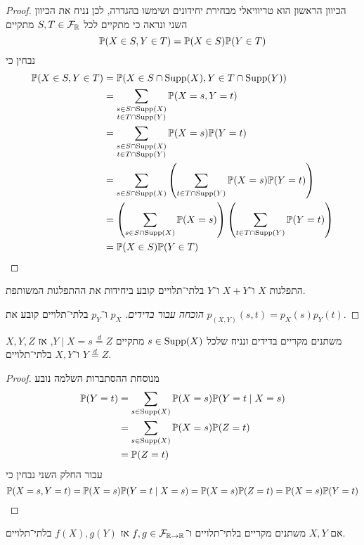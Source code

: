 \begin{proof}
	הכיוון הראשון הוא טריוויאלי מבחירת יחידונים ושימשו בהגדרה, לכן נניח את הכיוון השני ונראה כי מתקיים לכל $S, T \in \mathcal{F}_{\mathbb{R}}$ מתקיים
	\[
		\mathbb{P}(X \in S, Y \in T) = \mathbb{P}(X \in S) \mathbb{P}(Y \in T)
	\]
	נבחין כי
	\begin{align*}
		\mathbb{P}(X \in S, Y \in T)
		& = \mathbb{P}(X \in S \cap \operatorname{Supp}(X), Y \in T \cap \operatorname{Supp}(Y)) \\
		& = \sum_{\substack{s \in S \cap \operatorname{Supp}(X) \\ t \in T \cap \operatorname{Supp}(Y)}} \mathbb{P}(X = s, Y = t) \\
		& = \sum_{\substack{s \in S \cap \operatorname{Supp}(X) \\ t \in T \cap \operatorname{Supp}(Y)}} \mathbb{P}(X = s) \mathbb{P}(Y = t) \\
		& = \sum_{s \in S \cap \operatorname{Supp}(X)} \left( \sum_{t \in T \cap \operatorname{Supp}(Y)} \mathbb{P}(X = s) \mathbb{P}(Y = t) \right) \\
		& = \left( \sum_{s \in S \cap \operatorname{Supp}(X)} \mathbb{P}(X = s) \right) \left( \sum_{t \in T \cap \operatorname{Supp}(Y)} \mathbb{P}(Y = t) \right) \\
		& = \mathbb{P}(X \in S) \mathbb{P}(Y \in T)
	\end{align*}
\end{proof}
\begin{proposition}
	התפלגות $X$ ו־$X + Y$ ו־$Y$ בלתי־תלויים קובע ביחידות את ההתפלגות המשותפת.
\end{proposition}
\begin{proof}[הוכחה עבור בדידים]
	$p_X$ ו־$p_Y$ בלתי־תלויים קובע את $p_{(X, Y)}(s, t) = p_X(s) p_Y(t)$.
\end{proof}
\begin{proposition}
	$X, Y, Z$ משתנים מקריים בדידים ונניח שלכל $s \in \operatorname{Supp}(X)$ מתקיים $Y \mid X = s \overset{d}{=} Z$,
	אז $Y \overset{d}{=} Z$ ו־$X, Y$ בלתי־תלויים.
\end{proposition}
\begin{proof}
	מנוסחת ההסתברות השלמה נובע
	\begin{align*}
		\mathbb{P}(Y = t)
		& = \sum_{s \in \operatorname{Supp}(X)} \mathbb{P}(X = s) \mathbb{P}(Y = t \mid X = s) \\
		& = \sum_{s \in \operatorname{Supp}(X)} \mathbb{P}(X = s) \mathbb{P}(Z = t) \\
		& = \mathbb{P}(Z = t)
	\end{align*}
	עבור החלק השני נבחין כי
	\[
		\mathbb{P}(X = s, Y = t)
		= \mathbb{P}(X = s) \mathbb{P}(Y = t \mid X = s)
		= \mathbb{P}(X = s) \mathbb{P}(Z = t)
		= \mathbb{P}(X = s) \mathbb{P}(Y = t)
	\]
\end{proof}
\begin{proposition}
	אם $X, Y$ משתנים מקריים בלתי־תלויים ו־$f, g \in \mathcal{F}_{\mathbb{R} \to \mathbb{R}}$ אז $f(X), g(Y)$ בלתי־תלויים.
\end{proposition}
